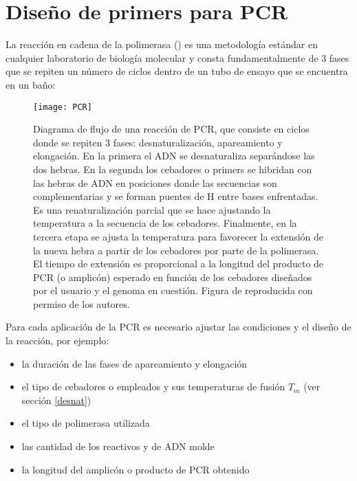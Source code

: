 \section{Dise\~no de primers para PCR} \label{dna2}

La reacci\'{o}n en cadena de la polimerasa 
()
es una metodolog\'{i}a est\'{a}ndar en cualquier laboratorio de biolog\'{i}a molecular y consta fundamentalmente
de 3 fases que se repiten un n\'{u}mero de ciclos dentro de un tubo de ensayo que se encuentra en un ba\~{n}o:

\begin{figure}
\begin{center} 
\texttt{[image: PCR]}
\caption{Diagrama de flujo de una reacci\'{o}n de PCR, 
que consiste en ciclos donde se repiten 3 fases: desnaturalizaci\'{o}n, apareamiento y elongaci\'{o}n.
En la primera el ADN se desnaturaliza separ\'{a}ndose las dos hebras.
En la segunda los cebadores o primers se hibridan con las hebras de ADN en posiciones donde las 
secuencias son complementarias y se forman puentes de H entre bases enfrentadas. 
Es una renaturalizaci\'{o}n parcial que se hace ajustando la temperatura a la secuencia de los cebadores. 
Finalmente, en la tercera etapa se ajusta la temperatura para favorecer la extensi\'{o}n de la nueva hebra
a partir de los cebadores por parte de la polimerasa. 
El tiempo de extensi\'{o}n es proporcional a la longitud del producto de PCR (o amplic\'{o}n) esperado
en funci\'{o}n de los cebadores dise\~{n}ados por el usuario y el genoma en cuesti\'{o}n.
Figura de \cite{Konietzny2003} reproducida con permiso de los autores.}
\label{fig:PCR}
\end{center}
\end{figure}

Para cada aplicaci\'{o}n de la PCR es necesario ajustar las condiciones y el dise\~no de la reacci\'{o}n,
por ejemplo:
\begin{itemize} 
\item la duraci\'{o}n de las fases de apareamiento y elongaci\'{o}n
\item el tipo de cebadores o  empleados y sus temperaturas de fusi\'{o}n $T_{m}$ (ver secci\'{o}n \ref{desnat})
\item el tipo de polimerasa utilizada
\item las cantidad de los reactivos y de ADN molde
\item la longitud del amplic\'{o}n o producto de PCR obtenido
\end{itemize}

